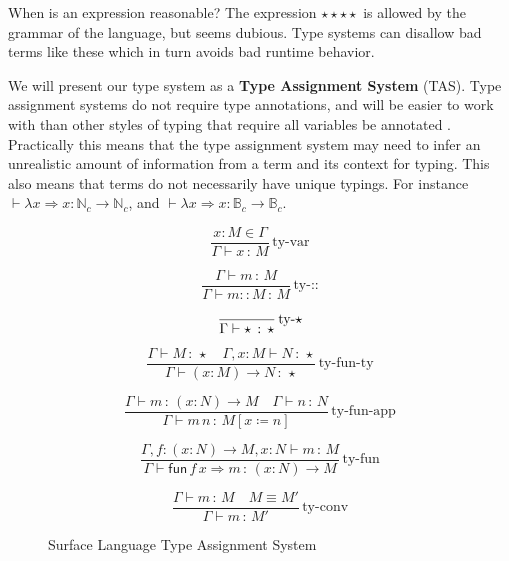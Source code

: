 When is an expression reasonable? The expression $\star\star\star\star$ is allowed by the grammar of the language, but seems dubious.
Type systems can disallow bad terms like these which in turn avoids bad runtime behavior.

We will present our type system as a \textbf{Type Assignment System} (TAS).
Type assignment systems do not require type annotations, and will be easier to work with than other styles of typing that require all variables be annotated  .
Practically this means that the type assignment system may need to infer an unrealistic amount of information from a term and its context for typing.
This also means that terms do not necessarily have unique typings.
For instance $\vdash\lambda x\Rightarrow x:\mathbb{N}_{c}\rightarrow\mathbb{N}_{c}$, and $\vdash\lambda x\Rightarrow x:\mathbb{B}_{c}\rightarrow\mathbb{B}_{c}$.




\begin{figure}
\[
\frac{x:M\in\Gamma}{\Gamma\vdash x\,:\,M}\,\textrm{ty-var}
\]

\[
\frac{\Gamma\vdash m\,:\,M}{\Gamma\vdash m::M\,:\,M}\,\textrm{ty-::}
\]

\[
\frac{{\color{gray}\ }}{\Gamma\vdash\star\,:\,\star}\,\textrm{ty-}\star
\]

\[
\frac{\Gamma\vdash M\,:\,\star\quad\Gamma,x:M\vdash N\,:\,\star}{\Gamma\vdash\left(x:M\right)\rightarrow N\,:\,\star}\,\textrm{ty-fun-ty}
\]

\[
\frac{\Gamma\vdash m\,:\,\left(x:N\right)\rightarrow M\quad\Gamma\vdash n\,:\,N}{\Gamma\vdash m\,n\,:\,M\left[x\coloneqq n\right]}\,\textrm{ty-fun-app}
\]

\[
\frac{\Gamma,f:\left(x:N\right)\rightarrow M,x:N\vdash m\,:\,M}{\Gamma\vdash\mathsf{fun}\,f\,x\Rightarrow m\,:\,\left(x:N\right)\rightarrow M}\,\textrm{ty-fun}
\]

\[
\frac{\Gamma\vdash m\,:\,M\quad M\equiv M'}{\Gamma\vdash m\,:\,M'}\,\textrm{ty-conv}
\]



\caption{Surface Language Type Assignment System}
\label{fig:surface-TAS}
\end{figure}

